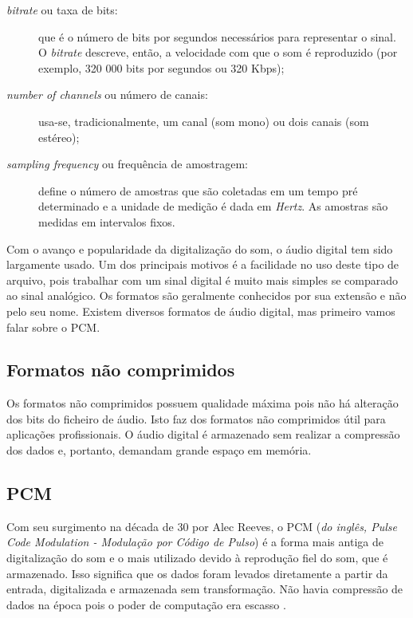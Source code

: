 \begin{description}
	\item [\textit{bitrate} ou taxa de bits:] que é o número de bits por segundos necessários para representar o sinal. O \textit{bitrate} descreve, então, a velocidade com que o som é reproduzido (por exemplo, 320 000 bits por segundos ou 320 Kbps);
	\item [\textit{number of channels} ou número de canais:] usa-se, tradicionalmente, um canal (som mono) ou dois canais (som estéreo); 
	\item [\textit{sampling frequency} ou frequência de amostragem:] define o número de amostras que são coletadas em um tempo pré determinado e a unidade de medição é dada em \textit{Hertz}. As amostras são medidas em intervalos fixos.
\end{description}

Com o avanço e popularidade da digitalização do som, o áudio digital tem sido largamente usado. Um dos principais motivos é a facilidade no uso deste tipo de arquivo, pois trabalhar com um sinal digital é muito mais simples se comparado ao sinal analógico. Os formatos são geralmente conhecidos por sua extensão e não pelo seu nome. Existem diversos formatos de áudio digital, mas primeiro vamos falar sobre o PCM.

\subsection{Formatos não comprimidos}

Os formatos não comprimidos possuem qualidade máxima pois não há alteração dos bits do ficheiro de áudio. Isto faz dos formatos não comprimidos útil para aplicações profissionais. O áudio digital é armazenado sem realizar a compressão dos dados e, portanto, demandam grande espaço em memória.

\subsection{PCM}

Com seu surgimento na década de 30 por Alec Reeves, o PCM (\textit{do inglês, Pulse Code Modulation - Modulação por Código de Pulso}) é a forma mais antiga de digitalização do som e o mais utilizado devido à reprodução fiel do som, que é armazenado. Isso significa que os dados foram levados diretamente a partir da entrada, digitalizada e armazenada sem transformação. Não havia compressão de dados na época pois o poder de computação era escasso \cite{pcm}.


